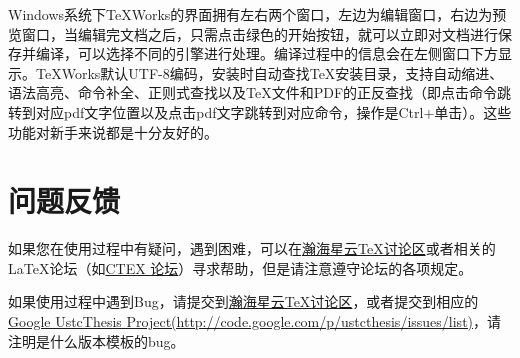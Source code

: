Windows系统下TeXWorks的界面拥有左右两个窗口，左边为编辑窗口，右边为预览窗口，当编辑完文档之后，只需点击绿色的开始按钮，就可以立即对文档进行保存并编译，可以选择不同的引擎进行处理。编译过程中的信息会在左侧窗口下方显示。TeXWorks默认UTF-8编码，安装时自动查找TeX安装目录，支持自动缩进、语法高亮、命令补全、正则式查找以及TeX文件和PDF的正反查找（即点击命令跳转到对应pdf文字位置以及点击pdf文字跳转到对应命令，操作是Ctrl+单击）。这些功能对新手来说都是十分友好的。

\section{问题反馈}

如果您在使用过程中有疑问，遇到困难，可以在\href{http://bbs.ustc.edu.cn/cgi/bbsdoc?board=TeX}{瀚海星云\TeX{}讨论区}或者相关的\LaTeX 论坛（如\href{http://bbs.ctex.org}{CTEX 论坛}）寻求帮助，但是请注意遵守论坛的各项规定。

如果使用过程中遇到Bug，请提交到\href{http://bbs.ustc.edu.cn/cgi/bbsdoc?board=TeX}{瀚海星云\TeX{}讨论区}，或者提交到相应的\href{http://code.google.com/p/ustcthesis/issues/list}{Google UstcThesis Project(http://code.google.com/p/ustcthesis/issues/list)}，请注明是什么版本模板的bug。